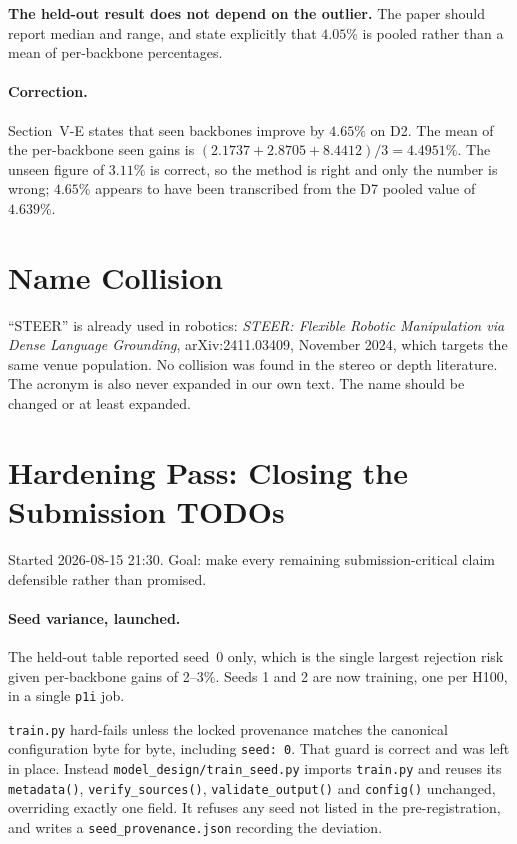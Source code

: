 \documentclass[11pt,a4paper]{article}
\begin{document}
\textbf{The held-out result does not depend on the outlier.} The paper
should report median and range, and state explicitly that $4.05\%$ is
pooled rather than a mean of per-backbone percentages.

\paragraph{Correction.}
Section~V-E states that seen backbones improve by $4.65\%$ on D2. The
mean of the per-backbone seen gains is
$(2.1737 + 2.8705 + 8.4412)/3 = \mathbf{4.4951\%}$. The unseen figure
of $3.11\%$ is correct, so the method is right and only the number is
wrong; $4.65\%$ appears to have been transcribed from the D7 pooled
value of $4.639\%$.

\section*{Name Collision}

``STEER'' is already used in robotics: \emph{STEER: Flexible Robotic
Manipulation via Dense Language Grounding}, arXiv:2411.03409, November
2024, which targets the same venue population. No collision was found
in the stereo or depth literature. The acronym is also never expanded
in our own text. The name should be changed or at least expanded.

\section*{Hardening Pass: Closing the Submission TODOs}

Started 2026-08-15 21:30. Goal: make every remaining submission-critical
claim defensible rather than promised.

\paragraph{Seed variance, launched.}
The held-out table reported seed~0 only, which is the single largest
rejection risk given per-backbone gains of 2--3\%. Seeds 1 and 2 are now
training, one per H100, in a single \texttt{p1i} job.

\texttt{train.py} hard-fails unless the locked provenance matches the
canonical configuration byte for byte, including \texttt{seed: 0}. That
guard is correct and was left in place. Instead
\texttt{model\_design/train\_seed.py} imports \texttt{train.py} and
reuses its \texttt{metadata()}, \texttt{verify\_sources()},
\texttt{validate\_output()} and \texttt{config()} unchanged, overriding
exactly one field. It refuses any seed not listed in the
pre-registration, and writes a \texttt{seed\_provenance.json} recording
the deviation.
\end{document}
